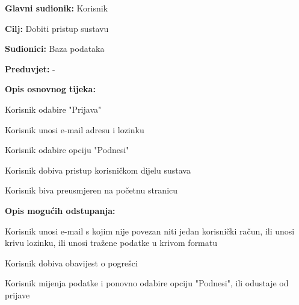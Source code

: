 					\noindent {}
					\begin{packed_item}
	
						\item \textbf{Glavni sudionik: }Korisnik
						\item  \textbf{Cilj:} Dobiti pristup sustavu
						\item  \textbf{Sudionici:} Baza podataka
						\item  \textbf{Preduvjet:} -
						\item  \textbf{Opis osnovnog tijeka:}
						
						\item[] \begin{packed_enum}
	
							\item Korisnik odabire "Prijava"
							\item Korisnik unosi e-mail adresu i lozinku
							\item Korisnik odabire opciju "Podnesi"
							\item Korisnik dobiva pristup korisničkom dijelu sustava
							\item Korisnik biva preusmjeren na početnu stranicu
						\end{packed_enum}
						
						\item  \textbf{Opis mogućih odstupanja:}
						
						\item[] \begin{packed_item}
	
							\item[3.a] Korisnik unosi e-mail s kojim nije povezan niti jedan korisnički račun, ili unosi krivu lozinku, ili unosi tražene podatke u krivom formatu
							\item[] \begin{packed_enum}
								
								\item Korisnik dobiva obavijest o pogrešci
								\item Korisnik mijenja podatke i ponovno odabire opciju "Podnesi", ili odustaje od prijave
								
							\end{packed_enum}
							
						\end{packed_item}
					\end{packed_item}
					
